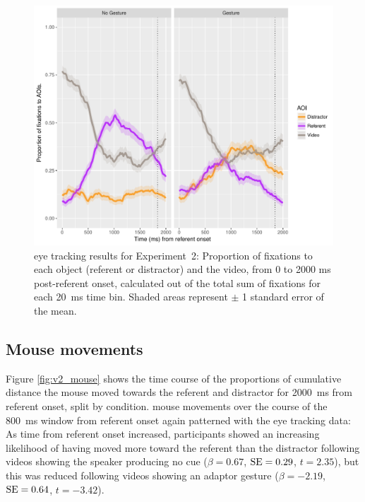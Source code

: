 \documentclass[a4paper,man,natbib]{apa6}
\newcommand{\resultsLM}[3]{$\beta = #1$, $\textnormal{SE} = #2$, $t #3$}
\begin{document}
\begin{figure}[Ht]
  \centering
	\includegraphics[width=\linewidth]{./img/e8_fixations.pdf}
  \caption{eye tracking results for Experiment~2: Proportion of fixations to each object (referent or distractor) and the video, from 0 to 2000 ms post-referent onset, calculated out of the total sum of fixations for each 20~ms time bin. Shaded areas represent $\pm$ 1 standard error of the mean.}
  \label{fig:v2_eye}
\end{figure}

\subsection{Mouse movements}
Figure \ref{fig:v2_mouse} shows the time course of the proportions of cumulative distance the mouse moved towards the referent and distractor for 2000~ms from referent onset, split by condition.
mouse movements over the course of the 800~ms window from referent onset again patterned with the eye tracking data:
As time from referent onset increased, participants showed an increasing likelihood of having moved more toward the referent than the distractor following videos showing the speaker producing no cue (\resultsLM{0.67}{0.29}{=2.35}), but this was reduced following videos showing an adaptor gesture (\resultsLM{-2.19}{0.64}{=-3.42}).
\end{document}
